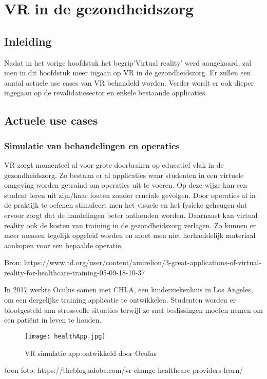 \chapter{VR in de gezondheidszorg}
\section{Inleiding}
Nadat in het vorige hoofdstuk het begrip'Virtual reality' werd aangekaard, zal men in dit hoofdstuk meer ingaan op VR in de gezondheidszorg. Er zullen een aantal actuele use cases van VR behandeld worden. Verder wordt er ook dieper ingegaan op de revalidatiesector en enkele bestaande applicaties.

\section{Actuele use cases}
\subsection{Simulatie van behandelingen en operaties}
VR zorgt momenteel al voor grote doorbraken op educatief vlak in de gezondheidszorg. Zo bestaan er al applicaties waar studenten in een virtuele omgeving worden getraind om operaties uit te voeren. Op deze wijze kan een student leren uit zijn/haar fouten zonder cruciale gevolgen. Door operaties al in de praktijk te oefenen stimuleert men het visuele en het fysieke geheugen dat ervoor zorgt dat de handelingen beter onthouden worden. Daarnaast kan virtual reality ook de kosten van training in de gezondheidszorg verlagen. Zo kunnen er meer mensen tegelijk opgeleid worden en moet men niet herhaaldelijk materiaal aankopen voor een bepaalde operatie.

Bron: https://www.td.org/user/content/amirelion/3-great-applications-of-virtual-reality-for-healthcare-training-05-09-18-10-37

In 2017 werkte Oculus samen met CHLA, een kinderziekenhuis in Los Angeles, om een dergelijke training applicatie te ontwikkelen. Studenten worden er blootgesteld aan stressvolle situaties terwijl ze snel beslissingen moeten nemen om een patiënt in leven te houden.

\begin{figure}[h]
	\centering
	\texttt{[image: healthApp.jpg]}
	\caption{VR simulatie app ontwikkeld door Oculus}
\end{figure}
bron foto: https://theblog.adobe.com/vr-change-healthcare-providers-learn/


